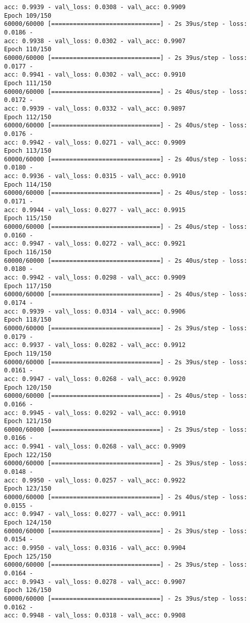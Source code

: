 \documentclass[11pt]{article}
\begin{document}
\begin{Verbatim}[commandchars=\\\{\}]
acc: 0.9939 - val\_loss: 0.0308 - val\_acc: 0.9909
Epoch 109/150
60000/60000 [==============================] - 2s 39us/step - loss: 0.0186 -
acc: 0.9938 - val\_loss: 0.0302 - val\_acc: 0.9907
Epoch 110/150
60000/60000 [==============================] - 2s 39us/step - loss: 0.0177 -
acc: 0.9941 - val\_loss: 0.0302 - val\_acc: 0.9910
Epoch 111/150
60000/60000 [==============================] - 2s 40us/step - loss: 0.0172 -
acc: 0.9939 - val\_loss: 0.0332 - val\_acc: 0.9897
Epoch 112/150
60000/60000 [==============================] - 2s 40us/step - loss: 0.0176 -
acc: 0.9942 - val\_loss: 0.0271 - val\_acc: 0.9909
Epoch 113/150
60000/60000 [==============================] - 2s 40us/step - loss: 0.0180 -
acc: 0.9936 - val\_loss: 0.0315 - val\_acc: 0.9910
Epoch 114/150
60000/60000 [==============================] - 2s 40us/step - loss: 0.0171 -
acc: 0.9944 - val\_loss: 0.0277 - val\_acc: 0.9915
Epoch 115/150
60000/60000 [==============================] - 2s 40us/step - loss: 0.0160 -
acc: 0.9947 - val\_loss: 0.0272 - val\_acc: 0.9921
Epoch 116/150
60000/60000 [==============================] - 2s 40us/step - loss: 0.0180 -
acc: 0.9942 - val\_loss: 0.0298 - val\_acc: 0.9909
Epoch 117/150
60000/60000 [==============================] - 2s 40us/step - loss: 0.0174 -
acc: 0.9939 - val\_loss: 0.0314 - val\_acc: 0.9906
Epoch 118/150
60000/60000 [==============================] - 2s 39us/step - loss: 0.0179 -
acc: 0.9937 - val\_loss: 0.0282 - val\_acc: 0.9912
Epoch 119/150
60000/60000 [==============================] - 2s 39us/step - loss: 0.0161 -
acc: 0.9947 - val\_loss: 0.0268 - val\_acc: 0.9920
Epoch 120/150
60000/60000 [==============================] - 2s 40us/step - loss: 0.0166 -
acc: 0.9945 - val\_loss: 0.0292 - val\_acc: 0.9910
Epoch 121/150
60000/60000 [==============================] - 2s 39us/step - loss: 0.0166 -
acc: 0.9941 - val\_loss: 0.0268 - val\_acc: 0.9909
Epoch 122/150
60000/60000 [==============================] - 2s 39us/step - loss: 0.0148 -
acc: 0.9950 - val\_loss: 0.0257 - val\_acc: 0.9922
Epoch 123/150
60000/60000 [==============================] - 2s 40us/step - loss: 0.0155 -
acc: 0.9947 - val\_loss: 0.0277 - val\_acc: 0.9911
Epoch 124/150
60000/60000 [==============================] - 2s 39us/step - loss: 0.0154 -
acc: 0.9950 - val\_loss: 0.0316 - val\_acc: 0.9904
Epoch 125/150
60000/60000 [==============================] - 2s 39us/step - loss: 0.0164 -
acc: 0.9943 - val\_loss: 0.0278 - val\_acc: 0.9907
Epoch 126/150
60000/60000 [==============================] - 2s 39us/step - loss: 0.0162 -
acc: 0.9948 - val\_loss: 0.0318 - val\_acc: 0.9908

\end{Verbatim}
\end{document}

